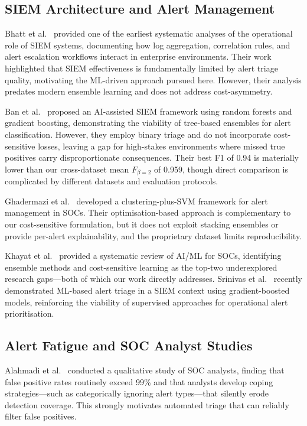 \documentclass[conference]{IEEEtran}
\begin{document}
\subsection{SIEM Architecture and Alert Management}
Bhatt et al.~\cite{bhatt2014} provided one of the earliest systematic analyses of the operational
role of SIEM systems, documenting how log aggregation, correlation rules, and alert escalation
workflows interact in enterprise environments.
Their work highlighted that SIEM effectiveness is fundamentally limited by alert triage quality,
motivating the ML-driven approach pursued here.
However, their analysis predates modern ensemble learning and does not address cost-asymmetry.

Ban et al.~\cite{ban2023} proposed an AI-assisted SIEM framework using random forests and gradient
boosting, demonstrating the viability of tree-based ensembles for alert classification.
However, they employ binary triage and do not incorporate cost-sensitive losses, leaving a gap
for high-stakes environments where missed true positives carry disproportionate consequences.
Their best F1 of 0.94 is materially lower than our cross-dataset mean $F_{\beta=2}$ of 0.959, though direct
comparison is complicated by different datasets and evaluation protocols.

Ghadermazi et al.~\cite{ghadermazi2024} developed a clustering-plus-SVM framework for alert
management in SOCs.
Their optimisation-based approach is complementary to our cost-sensitive formulation, but it
does not exploit stacking ensembles or provide per-alert explainability, and the proprietary
dataset limits reproducibility.

Khayat et al.~\cite{khayat2025} provided a systematic review of AI/ML for SOCs, identifying
ensemble methods and cost-sensitive learning as the top-two underexplored research gaps---both of
which our work directly addresses.
Srinivas et al.~\cite{srinivas2025} recently demonstrated ML-based alert triage in a SIEM
context using gradient-boosted models, reinforcing the viability of supervised approaches
for operational alert prioritisation.

\subsection{Alert Fatigue and SOC Analyst Studies}
Alahmadi et al.~\cite{alahmadi2020} conducted a qualitative study of SOC analysts, finding that
false positive rates routinely exceed 99\% and that analysts develop coping strategies---such as
categorically ignoring alert types---that silently erode detection coverage.
This strongly motivates automated triage that can reliably filter false positives.
\end{document}
